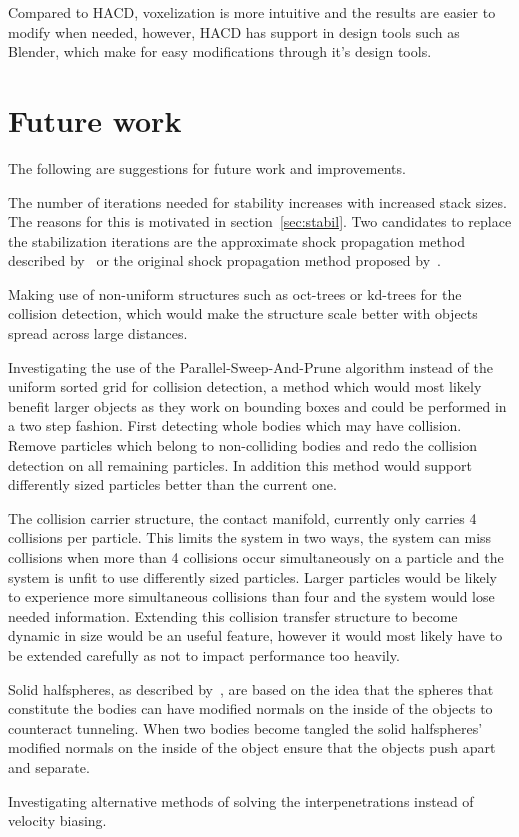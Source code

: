 Compared to HACD, voxelization is more intuitive and the results are easier to modify
when needed, however, HACD has support in design tools such as Blender, which make
for easy modifications through it's design tools.

\section{Future work}
The following are suggestions for future work and improvements.

The number of iterations needed for stability increases with increased stack sizes.
The reasons for this is motivated in section~\ref{sec:stabil}.
Two candidates to replace the stabilization iterations are
the approximate shock propagation method described by~\cite{flex} or the original
shock propagation method proposed by~\cite{guendelman}.

Making use of non-uniform structures such as oct-trees or kd-trees for the collision
detection, which would make the structure scale better with objects spread across
large distances.

Investigating the use of the Parallel-Sweep-And-Prune algorithm instead of the
uniform sorted grid for collision detection, a method which would most likely
benefit larger objects as they work on bounding boxes and could be performed
in a two step fashion. First detecting whole bodies which may have collision.
Remove particles which belong to non-colliding bodies and redo the collision detection
on all remaining particles. In addition this method would support differently sized
particles better than the current one.

The collision carrier structure, the contact manifold, currently only carries
4 collisions per particle. This limits the system in two ways, the system can miss
collisions when more than 4 collisions occur simultaneously on a particle and the
system is unfit to use differently sized particles. Larger particles would
be likely to experience more simultaneous collisions than four and the system would
lose needed information. Extending this collision transfer structure to become dynamic
in size would be an useful feature, however it would most likely have
to be extended carefully as not to impact performance too heavily.

Solid halfspheres, as described by~\cite{flex}, are based on the idea that the spheres that
constitute the bodies can have modified normals on the inside of the objects to counteract
tunneling. When two bodies become tangled the solid halfspheres' modified normals
on the inside of the object ensure that the objects push apart and separate.

Investigating alternative methods of solving the interpenetrations instead of velocity biasing.
